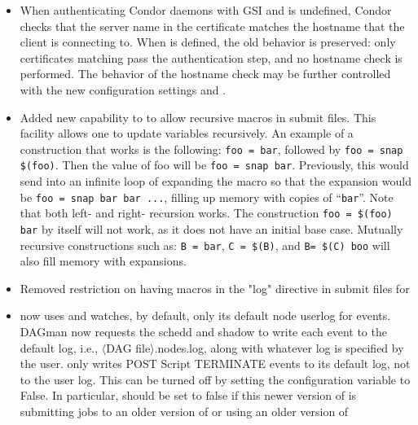 \begin{itemize}
\item When authenticating Condor daemons with GSI and
 is undefined, Condor checks
that the server name in the certificate matches the hostname that
the client is connecting to.  When  is
defined, the old behavior is preserved: only certificates matching
 pass the authentication step, and no
hostname check is performed.  The behavior of the hostname check
may be further controlled with the new configuration settings
 and
.

\item Added new capability to  to allow recursive macros in
submit files. This facility allows one to update variables recursively.  An
example of a construction that works is the following: \texttt{foo = bar},
followed by \texttt{foo =  snap \$(foo)}.  Then the value of foo will be
\texttt{foo = snap bar}.  Previously, this would send  into an
infinite loop of expanding the macro so that the expansion would be \texttt{foo
= snap bar bar ...}, filling up memory with copies of ``\texttt{bar}''. Note
that both left- and right- recursion works.  The construction \texttt{foo =
\$(foo) bar} by itself will not work, as it does not have an initial base case.
Mutually recursive constructions such as: \texttt{B = bar}, \texttt{C = \$(B)},
and \texttt{B= \$(C) boo} will also fill memory with expansions.

\item Removed restriction on having macros in the "log" directive in submit
files for 

\item {} now uses and watches, by default, only its default node
userlog for events.  DAGman now requests the schedd and shadow to write each
event to the default log, i.e., $\langle$DAG file$\rangle$.nodes.log, along
with whatever log is specified by the user.   only writes POST
Script TERMINATE events to its default log, not to the user log. This can be
turned off by setting the configuration variable
 to False.  In particular,
 should be set to false if this newer
version of  is submitting jobs to an older version of
 or using an older version of 

\end{itemize}

